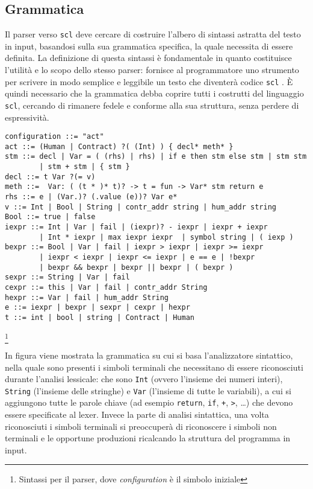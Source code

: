 \documentclass[]{article}
\begin{document}
\hypertarget{grammatica}{%
\subsection{Grammatica}\label{grammatica}}

Il parser verso \texttt{scl} deve cercare di costruire l'albero di
sintassi astratta del testo in input, basandosi sulla sua grammatica
specifica, la quale necessita di essere definita. La definizione di
questa sintassi è fondamentale in quanto costituisce l'utilità e lo
scopo dello stesso parser: fornisce al programmatore uno strumento per
scrivere in modo semplice e leggibile un testo che diventerà codice
\texttt{scl} . È quindi necessario che la grammatica debba coprire tutti
i costrutti del linguaggio \texttt{scl}, cercando di rimanere fedele e
conforme alla sua struttura, senza perdere di espressività.

\begin{verbatim}
configuration ::= "act" 
act ::= (Human | Contract) ?( (Int) ) { decl* meth* }
stm ::= decl | Var = ( (rhs) | rhs) | if e then stm else stm | stm stm 
        | stm + stm | { stm }
decl ::= t Var ?(= v)
meth ::=  Var: ( (t * )* t)? -> t = fun -> Var* stm return e
rhs ::= e | (Var.)? (.value (e))? Var e*
v ::= Int | Bool | String | contr_addr string | hum_addr string
Bool ::= true | false 
iexpr ::= Int | Var | fail | (iexpr)? - iexpr | iexpr + iexpr 
        | Int * iexpr | max iexpr iexpr  | symbol string | ( iexp )
bexpr ::= Bool | Var | fail | iexpr > iexpr | iexpr >= iexpr 
        | iexpr < iexpr | iexpr <= iexpr | e == e | !bexpr 
        | bexpr && bexpr | bexpr || bexpr | ( bexpr )  
sexpr ::= String | Var | fail
cexpr ::= this | Var | fail | contr_addr String
hexpr ::= Var | fail | hum_addr String
e ::= iexpr | bexpr | sexpr | cexpr | hexpr
t ::= int | bool | string | Contract | Human
\end{verbatim}

\footnote{Sintassi per il parser, dove \emph{configuration} è il simbolo
  iniziale}

In figura viene mostrata la grammatica su cui si basa l'analizzatore
sintattico, nella quale sono presenti i simboli terminali che
necessitano di essere riconosciuti durante l'analisi lessicale: che sono
\texttt{Int} (ovvero l'insieme dei numeri interi), \texttt{String}
(l'insieme delle stringhe) e \texttt{Var} (l'insieme di tutte le
variabili), a cui si aggiungono tutte le parole chiave (ad esempio
\texttt{return}, \texttt{if}, \texttt{+}, \texttt{\textgreater{}},
\ldots{}) che devono essere specificate al lexer. Invece la parte di
analisi sintattica, una volta riconosciuti i simboli terminali si
preoccuperà di riconoscere i simboli non terminali e le opportune
produzioni ricalcando la struttura del programma in input.
\end{document}
